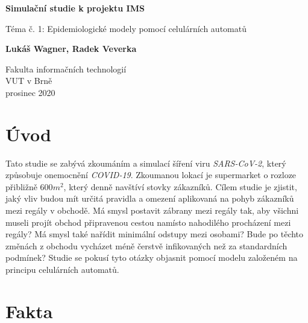 \documentclass[11pt,a4paper]{article}
\begin{document}
 

\begin{titlepage}
   \begin{center}
       \vspace*{1cm}

       \textbf{Simulační studie k projektu IMS}

       \vspace{0.5cm}
        Téma č. 1: Epidemiologické modely pomocí celulárních automatů 
            
       \vspace{1.5cm}

       \textbf{Lukáš Wagner, Radek Veverka}

       \vfill
            
       Fakulta informačních technologií\\
       VUT v Brně\\
       prosinec 2020\\
       
   \end{center}
\end{titlepage}

\tableofcontents
\newpage

\section{Úvod}

Tato studie se zabývá zkoumáním a simulací šíření viru \emph{SARS-CoV-2}, který způsobuje onemocnění \emph{COVID-19}. 
Zkoumanou lokací je supermarket o rozloze přibližně 600$m^{2}$, který denně navštíví stovky zákazníků. 
Cílem studie je zjistit, jaký vliv budou mít určitá pravidla a omezení aplikovaná na pohyb zákazníků mezi regály v obchodě. 
Má smysl postavit zábrany mezi regály tak, aby všichni museli projít obchod připravenou cestou namísto nahodilého procházení mezi regály?  
Má smysl také nařídit minimální odstupy mezi osobami? Bude po těchto změnách z obchodu vycházet méně čerstvě infikovaných než za standardních podmínek? 
Studie se pokusí tyto otázky objasnit pomocí modelu založeném na principu celulárních automatů. 

\section{Fakta}
\end{document}

